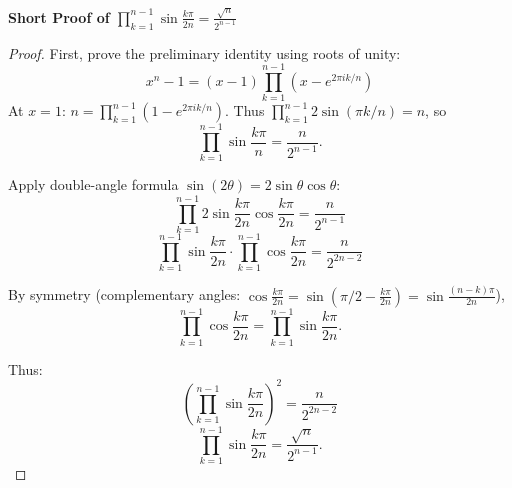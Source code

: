 \documentclass[10pt]{article}
\begin{document}
\textbf{Short Proof of $\prod_{k=1}^{n-1} \sin\frac{k\pi}{2n} = \frac{\sqrt{n}}{2^{n-1}}$}

\begin{proof}
First, prove the preliminary identity using roots of unity:
\[
x^n - 1 = (x-1)\prod_{k=1}^{n-1}(x - e^{2\pi ik/n})
\]
At $x=1$: $n = \prod_{k=1}^{n-1}(1 - e^{2\pi ik/n})$. Thus $\prod_{k=1}^{n-1} 2\sin(\pi k/n) = n$, so
\[
\prod_{k=1}^{n-1} \sin\frac{k\pi}{n} = \frac{n}{2^{n-1}}.
\]

Apply double-angle formula $\sin(2\theta) = 2\sin\theta\cos\theta$:
\[
\prod_{k=1}^{n-1} 2\sin\frac{k\pi}{2n}\cos\frac{k\pi}{2n} = \frac{n}{2^{n-1}}
\]
\[
\prod_{k=1}^{n-1} \sin\frac{k\pi}{2n} \cdot \prod_{k=1}^{n-1} \cos\frac{k\pi}{2n} = \frac{n}{2^{2n-2}}
\]

By symmetry (complementary angles: $\cos\frac{k\pi}{2n} = \sin(\pi/2 - \frac{k\pi}{2n}) = \sin\frac{(n-k)\pi}{2n}$),
\[
\prod_{k=1}^{n-1} \cos\frac{k\pi}{2n} = \prod_{k=1}^{n-1} \sin\frac{k\pi}{2n}.
\]

Thus:
\[
\left(\prod_{k=1}^{n-1} \sin\frac{k\pi}{2n}\right)^2 = \frac{n}{2^{2n-2}}
\]
\[
\prod_{k=1}^{n-1} \sin\frac{k\pi}{2n} = \frac{\sqrt{n}}{2^{n-1}}.
\]
\end{proof}
\end{document}
